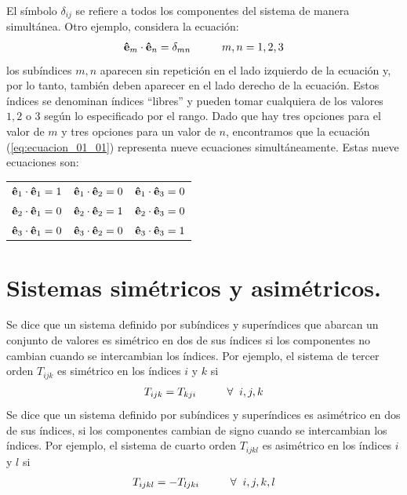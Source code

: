 \documentclass[hidelinks,12pt]{article}
\begin{document}
El símbolo $\delta_{ij}$ se refiere a todos los componentes del sistema de manera simultánea. Otro ejemplo, considera la ecuación:
\begin{align}
\vu{e}_{m} \cdot \vu{e}_{n} = \delta_{mn} \hspace{1cm} m, n = 1, 2, 3
\label{eq:ecuacion_01_01}
\end{align}
los subíndices $m, n$ aparecen sin repetición en el lado izquierdo de la ecuación y, por lo tanto, también deben aparecer en el lado derecho de la ecuación. Estos índices se denominan índices \enquote{libres} y pueden tomar cualquiera de los valores $1, 2$ o $3$ según lo especificado por el rango. Dado que hay tres opciones para el valor de $m$ y tres opciones para un valor de $n$, encontramos que la ecuación (\ref{eq:ecuacion_01_01}) representa nueve ecuaciones simultáneamente. Estas nueve ecuaciones son:
\begin{table}[H]
\large
\centering
\begin{tabular}{c c c}
$\vu{e}_{1} \cdot \vu{e}_{1} = 1$ & $\vu{e}_{1} \cdot \vu{e}_{2} = 0$ & $\vu{e}_{1} \cdot \vu{e}_{3} = 0$ \\
$\vu{e}_{2} \cdot \vu{e}_{1} = 0$ & $\vu{e}_{2} \cdot \vu{e}_{2} = 1$ & $\vu{e}_{2} \cdot \vu{e}_{3} = 0$ \\
$\vu{e}_{3} \cdot \vu{e}_{1} = 0$ & $\vu{e}_{3} \cdot \vu{e}_{2} = 0$ & $\vu{e}_{3} \cdot \vu{e}_{3} = 1$
\end{tabular}
\end{table}

\section{Sistemas simétricos y asimétricos.}

Se dice que un sistema definido por subíndices y superíndices que abarcan un conjunto de valores es simétrico en dos de sus índices si los componentes no cambian cuando se intercambian los índices. Por ejemplo, el sistema de tercer orden $T_{ijk}$ es simétrico en los índices $i$ y $k$ si
\begin{align*}
T_{ijk} = T_{kji} \hspace{1cm} \forall \hspace{0.2cm} i, j, k
\end{align*}
Se dice que un sistema definido por subíndices y superíndices es asimétrico en dos de sus índices, si los componentes cambian de signo cuando se intercambian los índices. Por ejemplo, el sistema de cuarto orden $T_{ijkl}$ es asimétrico en los índices $i$ y $l$ si
\begin{align*}
T_{ijkl} = -T_{ljki} \hspace{1cm} \forall \hspace{0.2cm} i, j, k, l
\end{align*}
\end{document}
